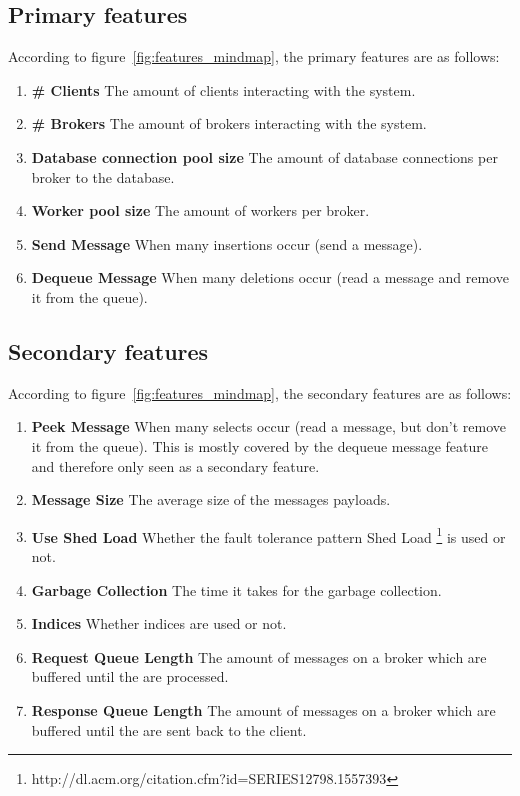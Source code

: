 \documentclass[milestone1.tex]{subfiles}
\begin{document}
\subsection{Primary features}

According to figure~\ref{fig:features_mindmap}, the primary features are as follows:

\begin{enumerate}
  \item \textbf{\# Clients} The amount of clients interacting with the system.
  \item \textbf{\# Brokers} The amount of brokers interacting with the system.
  \item \textbf{Database connection pool size} The amount of database connections per broker to the database.
  \item \textbf{Worker pool size} The amount of workers per broker.
  \item \textbf{Send Message} When many insertions occur (send a message).
  \item \textbf{Dequeue Message} When many deletions occur (read a message and remove it from the queue).
\end{enumerate}


\subsection{Secondary features}

According to figure~\ref{fig:features_mindmap}, the secondary features are as follows:

\begin{enumerate}
  \item \textbf{Peek Message} When many selects occur (read a message, but don't remove it from the queue). This is mostly covered by the dequeue message feature and therefore only seen as a secondary feature.
  \item \textbf{Message Size} The average size of the messages payloads.
  \item \textbf{Use Shed Load} Whether the fault tolerance pattern Shed Load \footnote{http://dl.acm.org/citation.cfm?id=SERIES12798.1557393} is used or not.
  \item \textbf{Garbage Collection} The time it takes for the garbage collection.
  \item \textbf{Indices} Whether indices are used or not.
  \item \textbf{Request Queue Length} The amount of messages on a broker which are buffered until the are processed.
    \item \textbf{Response Queue Length} The amount of messages on a broker which are buffered until the are sent back to the client.
\end{enumerate}
\end{document}
